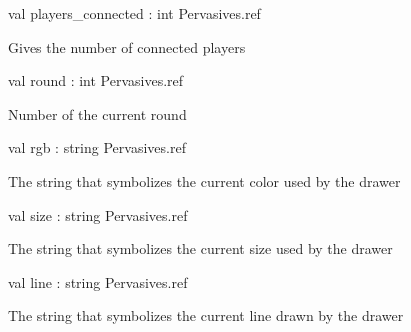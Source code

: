 \documentclass[11pt]{article}
\begin{document}
\label{val:Server.players-underscoreconnected}\begin{ocamldoccode}
val players_connected : int Pervasives.ref
\end{ocamldoccode}
\begin{ocamldocdescription}
Gives the number of connected players


\end{ocamldocdescription}




\label{val:Server.round}\begin{ocamldoccode}
val round : int Pervasives.ref
\end{ocamldoccode}
\begin{ocamldocdescription}
Number of the current round


\end{ocamldocdescription}




\label{val:Server.rgb}\begin{ocamldoccode}
val rgb : string Pervasives.ref
\end{ocamldoccode}
\begin{ocamldocdescription}
The string that symbolizes the current color used by the drawer


\end{ocamldocdescription}




\label{val:Server.size}\begin{ocamldoccode}
val size : string Pervasives.ref
\end{ocamldoccode}
\begin{ocamldocdescription}
The string that symbolizes the current size used by the drawer


\end{ocamldocdescription}




\label{val:Server.line}\begin{ocamldoccode}
val line : string Pervasives.ref
\end{ocamldoccode}
\begin{ocamldocdescription}
The string that symbolizes the current line drawn by the drawer


\end{ocamldocdescription}
\end{document}
